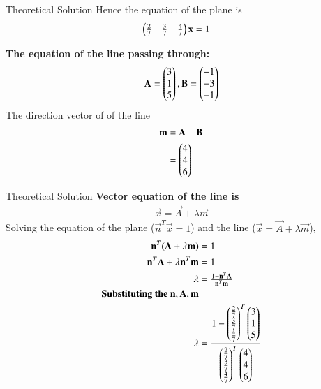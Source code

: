 \documentclass{beamer}
\begin{document}
\begin{frame}{Theoretical Solution }
Hence the equation of the plane is 
\begin{align} 
\begin{pmatrix}\tfrac{2}{7}&\tfrac{3}{7} &\tfrac{4}{7}\end{pmatrix}\mathbf{x}&=1
\end{align}

\textbf{The equation of the line passing through:}\\
\begin{align}
\mathbf{A}=\begin{pmatrix}3\\1\\5\end{pmatrix},\mathbf{B}=\begin{pmatrix}-1\\-3\\-1\end{pmatrix}\\
\end{align}
The direction vector of of the line
\begin{align}
\mathbf{m}&=\mathbf{A}-\mathbf{B}\\
&=\begin{pmatrix}4\\4\\6\end{pmatrix}
\end{align}
\end{frame}
\begin{frame}{Theoretical Solution }
\textbf{Vector equation of the line is}
\begin{align}
\vec{x}=\vec{A}+\lambda\vec{m}
\end{align}
Solving the equation of the plane ($\vec{n}^{T}\vec{x}=1$) and the line ($\vec{x}=\vec{A}+\lambda\vec{m}$),
\begin{align}
\mathbf{n}^{T}(\mathbf{A}+\lambda\mathbf{m})&=1\\
\mathbf{n}^{T}\mathbf{A}+\lambda\mathbf{n}^{T}\mathbf{m}&=1\\
\lambda&=\tfrac{1-\mathbf{n}^{T}\mathbf{A}}{\mathbf{n}^{T}\mathbf{m}}\\
\textbf{Substituting the $\mathbf{n},\mathbf{A},\mathbf{m}$}\\
\lambda&=\dfrac{1-\begin{pmatrix}\tfrac{2}{7}\\\tfrac{3}{7} \\\tfrac{4}{7}\end{pmatrix}^{T}\begin{pmatrix}3\\1\\5\end{pmatrix}}{\begin{pmatrix}\tfrac{2}{7}\\\tfrac{3}{7} \\\tfrac{4}{7}\end{pmatrix}^{T}\begin{pmatrix}4\\4\\6\end{pmatrix}}\\
\end{align}
\end{frame}
\end{document}
